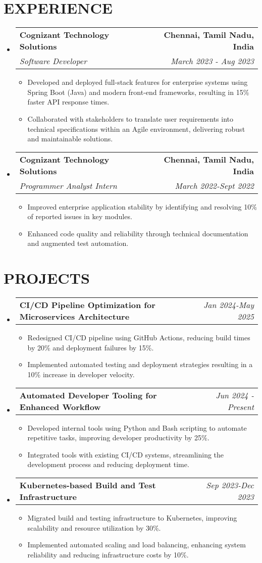\documentclass[letterpaper,11pt]{article}
\makeatletter
\newcommand{\resumeItem}[1]{\item\small{{#1 \vspace{-3pt}}}}
\newcommand{\resumeSubheading}[4]{\vspace{-2pt}\item\begin{tabular*}{0.97\textwidth}[t]{l@{\extracolsep{\fill}}r}\textbf{#1} & #2 \\\textit{\small#3} & \textit{\small #4} \\\end{tabular*}\vspace{-7pt}}
\newcommand{\resumeProjectHeading}[2]{\item\begin{tabular*}{0.97\textwidth}{l@{\extracolsep{\fill}}r}\small#1 & #2 \\\end{tabular*}\vspace{-7pt}}
\newcommand{\resumeSubHeadingListStart}{\begin{itemize}[leftmargin=0.15in, label={}]}
\newcommand{\resumeSubHeadingListEnd}{\end{itemize}}
\newcommand{\resumeItemListStart}{\begin{itemize}}
\newcommand{\resumeItemListEnd}{\end{itemize}\vspace{-5pt}}
\makeatother
\begin{document}
\section{{\fontsize{9pt}{20pt}\selectfont \textbf{EXPERIENCE}}}
\resumeSubHeadingListStart
\resumeSubheading{Cognizant Technology Solutions}{\textbf{Chennai, Tamil Nadu, India}}{Software Developer}{March 2023 - Aug 2023}
\resumeItemListStart
\resumeItem{Developed and deployed full-stack features for enterprise systems using Spring Boot (Java) and modern front-end frameworks, resulting in 15\% faster API response times.}
\resumeItem{Collaborated with stakeholders to translate user requirements into technical specifications within an Agile environment, delivering robust and maintainable solutions.}
\resumeItemListEnd
\resumeSubheading{Cognizant Technology Solutions}{\textbf{Chennai, Tamil Nadu, India}}{Programmer Analyst Intern}{March 2022-Sept 2022}
\resumeItemListStart
\resumeItem{Improved enterprise application stability by identifying and resolving 10\% of reported issues in key modules.}
\resumeItem{Enhanced code quality and reliability through technical documentation and augmented test automation.}
\resumeItemListEnd
\resumeSubHeadingListEnd
\vspace{-17pt}

\section{{\fontsize{9pt}{20pt}\selectfont \textbf{PROJECTS}}}
\resumeSubHeadingListStart
\resumeProjectHeading{\textbf{CI/CD Pipeline Optimization for Microservices Architecture}}{\textit{Jan 2024-May 2025}}
\resumeItemListStart
\resumeItem{Redesigned CI/CD pipeline using GitHub Actions, reducing build times by 20\% and deployment failures by 15\%.}
\resumeItem{Implemented automated testing and deployment strategies resulting in a 10\% increase in developer velocity.}
\resumeItemListEnd\vspace{-6pt}
\resumeProjectHeading{\textbf{Automated Developer Tooling for Enhanced Workflow}}{\textit{Jun 2024 - Present}}
\resumeItemListStart
\resumeItem{Developed internal tools using Python and Bash scripting to automate repetitive tasks, improving developer productivity by 25\%.}
\resumeItem{Integrated tools with existing CI/CD systems, streamlining the development process and reducing deployment time.}
\resumeItemListEnd\vspace{-6pt}
\resumeProjectHeading{\textbf{Kubernetes-based Build and Test Infrastructure}}{\textit{Sep 2023-Dec 2023}}
\resumeItemListStart
\resumeItem{Migrated build and testing infrastructure to Kubernetes, improving scalability and resource utilization by 30\%.}
\resumeItem{Implemented automated scaling and load balancing, enhancing system reliability and reducing infrastructure costs by 10\%.}
\resumeItemListEnd
\resumeSubHeadingListEnd
\vspace{-17pt}
\end{document}
